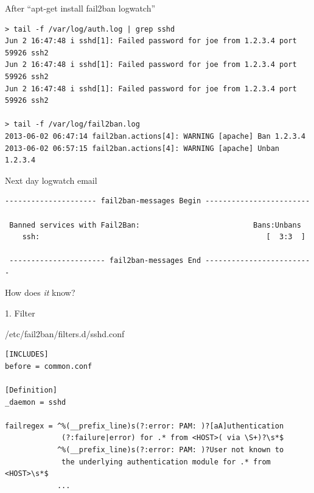 \documentclass[]{beamer}
\begin{document}
\begin{frame}[fragile]{After ``apt-get install fail2ban logwatch''}

\begin{Verbatim}[commandchars=\\\{\},fontsize=\scriptsize]
> tail -f /var/log/auth.log | grep sshd
Jun 2 16:47:48 i sshd[1]: Failed password for joe from 1.2.3.4 port 59926 ssh2
Jun 2 16:47:48 i sshd[1]: Failed password for joe from 1.2.3.4 port 59926 ssh2
Jun 2 16:47:48 i sshd[1]: Failed password for joe from 1.2.3.4 port 59926 ssh2

> tail -f /var/log/fail2ban.log
2013-06-02 06:47:14 fail2ban.actions[4]: WARNING [apache] Ban 1.2.3.4
2013-06-02 06:57:15 fail2ban.actions[4]: WARNING [apache] Unban 1.2.3.4
\end{Verbatim}

\begin{block}{Next day logwatch email}

\begin{Verbatim}[commandchars=\\\{\},fontsize=\scriptsize]
 --------------------- fail2ban-messages Begin ------------------------

 Banned services with Fail2Ban:                          Bans:Unbans
    ssh:                                                    [  3:3  ]

 ---------------------- fail2ban-messages End -------------------------
\end{Verbatim}
\end{block}

\end{frame}

\begin{frame}{}
\begin{center}
\Large How does \emph{it} know?
\end{center}
\end{frame}

\begin{frame}[fragile]{1. Filter}

\begin{block}{/etc/fail2ban/filters.d/sshd.conf}
{\scriptsize
\begin{verbatim}
[INCLUDES]
before = common.conf

[Definition]
_daemon = sshd

failregex = ^%(__prefix_line)s(?:error: PAM: )?[aA]uthentication
             (?:failure|error) for .* from <HOST>( via \S+)?\s*$
            ^%(__prefix_line)s(?:error: PAM: )?User not known to
             the underlying authentication module for .* from <HOST>\s*$
            ...
\end{verbatim}
}
\end{block}
\end{frame}
\end{document}
